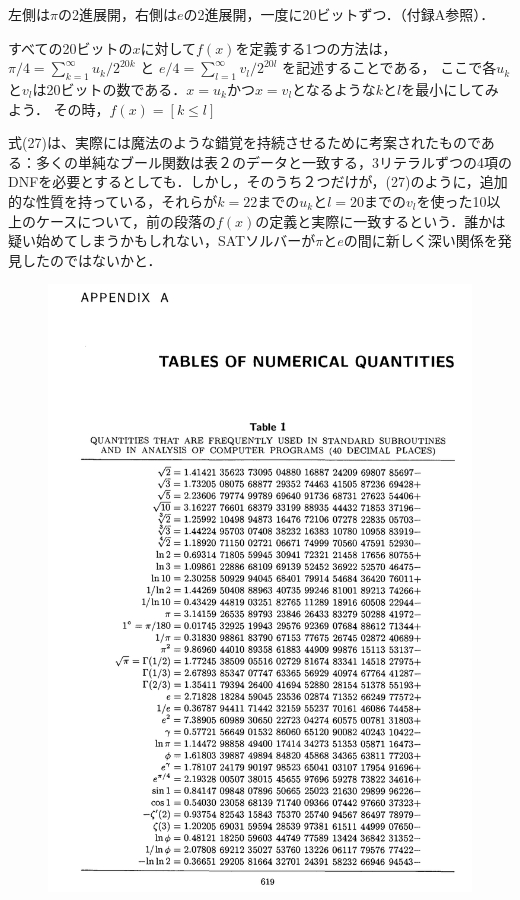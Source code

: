 \documentclass[dvipdfmx,a4paper,12pt]{jsarticle}
\begin{document}
  
  
 左側は$π$の2進展開，右側は$e$の2進展開，一度に20ビットずつ．（付録A参照）．
 
すべての20ビットの$x$に対して$f(x)$を定義する1つの方法は，$π/4 = \sum_{k=1}^\infty u_{k}/2^{20k}$ と $e/4 = \sum_{l=1}^\infty v_{l}/2^{20l}$ を記述することである，
ここで各$u_{k}$と$v_{l}$は20ビットの数である．$x=u_{k}$かつ$x=v_{l}$となるような$k$と$l$を最小にしてみよう．
その時，$f(x) = [k \leq l]$

式(27)は、実際には魔法のような錯覚を持続させるために考案されたものである：多くの単純なブール関数は表２のデータと一致する，3リテラルずつの4項のDNFを必要とするとしても．しかし，そのうち２つだけが，(27)のように，追加的な性質を持っている，それらが$k=22$までの$u_{k}$と$l=20$までの$v_{l}$を使った10以上のケースについて，前の段落の$f(x)$の定義と実際に一致するという．誰かは疑い始めてしまうかもしれない，SATソルバーが$π$と$e$の間に新しく深い関係を発見したのではないかと．

   \begin{figure}[htbp]
  \centering
  \includegraphics[width=142mm,angle=0]{images/appen.png}
  \end{figure}
\end{document}
